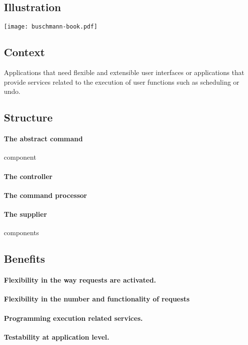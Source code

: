 \documentclass[a4paper,11pt,twocolumn]{report}
\begin{document}
    \subsection{Illustration}
    \texttt{[image: buschmann-book.pdf]}
    \subsection{Context}
    Applications that need flexible and extensible user interfaces or
    applications that provide services related to the execution of user
    functions such as scheduling or undo.
    \subsection{Structure}
    \paragraph{The abstract command} component
    \paragraph{The controller}
    \paragraph{The command processor}
    \paragraph{The supplier} components
    \subsection{Benefits}
    \paragraph{Flexibility in the way requests are activated.}
    \paragraph{Flexibility in the number and functionality of requests}
    \paragraph{Programming execution related services.}
    \paragraph{Testability at application level.}
\end{document}
